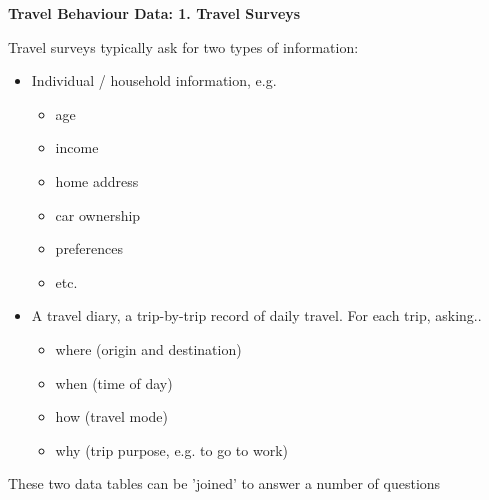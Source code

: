 \documentclass[aspectratio=169]{beamer}
\begin{document}
\begin{frame}
	
	\textbf{Travel Behaviour Data: 1. Travel Surveys}
	
	\vspace{2mm}
	
	Travel surveys typically ask for two types of information:
	
	\begin{itemize}
		\item Individual / household information, e.g. 
		\begin{itemize}
			\item age
			\item income
			\item home address
			\item car ownership
			\item preferences
			\item etc.
		\end{itemize}
		
		\item A travel diary, a trip-by-trip record of daily travel. For each trip, asking..
		\begin{itemize}
			\item where (origin and destination)
			\item when (time of day)
			\item how (travel mode)
			\item why (trip purpose, e.g. to go to work)
		\end{itemize}
	\end{itemize}

	These two data tables can be 'joined' to answer a number of questions

\end{frame}
\end{document}
